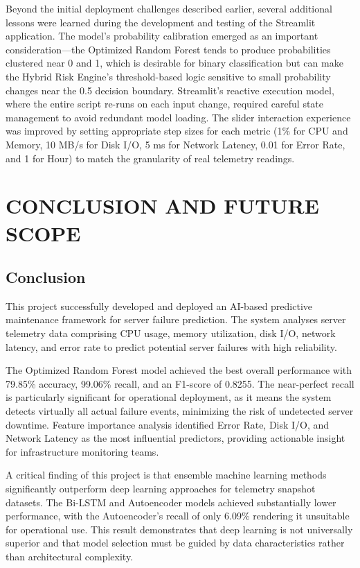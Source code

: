 \documentclass[12pt,letterpaper]{report}
\begin{document}
Beyond the initial deployment challenges described earlier, several additional lessons were learned during the development and testing of the Streamlit application. The model's probability calibration emerged as an important consideration---the Optimized Random Forest tends to produce probabilities clustered near 0 and 1, which is desirable for binary classification but can make the Hybrid Risk Engine's threshold-based logic sensitive to small probability changes near the 0.5 decision boundary. Streamlit's reactive execution model, where the entire script re-runs on each input change, required careful state management to avoid redundant model loading. The slider interaction experience was improved by setting appropriate step sizes for each metric (1\% for CPU and Memory, 10 MB/s for Disk I/O, 5 ms for Network Latency, 0.01 for Error Rate, and 1 for Hour) to match the granularity of real telemetry readings.


\chapter{CONCLUSION AND FUTURE SCOPE}

\section{Conclusion}

This project successfully developed and deployed an AI-based predictive maintenance framework for server failure prediction. The system analyses server telemetry data comprising CPU usage, memory utilization, disk I/O, network latency, and error rate to predict potential server failures with high reliability.

The Optimized Random Forest model achieved the best overall performance with 79.85\% accuracy, 99.06\% recall, and an F1-score of 0.8255. The near-perfect recall is particularly significant for operational deployment, as it means the system detects virtually all actual failure events, minimizing the risk of undetected server downtime. Feature importance analysis identified Error Rate, Disk I/O, and Network Latency as the most influential predictors, providing actionable insight for infrastructure monitoring teams.

A critical finding of this project is that ensemble machine learning methods significantly outperform deep learning approaches for telemetry snapshot datasets. The Bi-LSTM and Autoencoder models achieved substantially lower performance, with the Autoencoder's recall of only 6.09\% rendering it unsuitable for operational use. This result demonstrates that deep learning is not universally superior and that model selection must be guided by data characteristics rather than architectural complexity.
\end{document}
